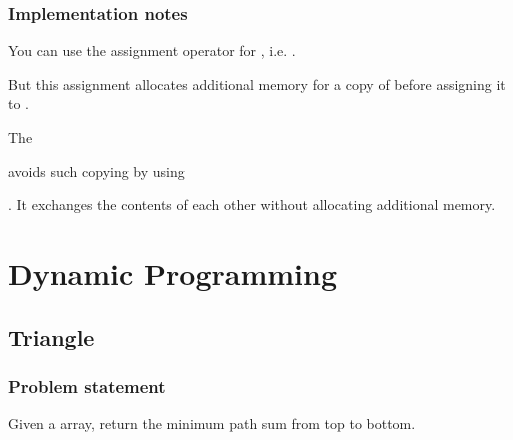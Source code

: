 \documentclass[letterpaper,12pt,english]{book}
\begin{document}
\subsection{Implementation notes}
\label{\detokenize{Recursive/17_Letter_Combinations_of_a_Phone_Number:implementation-notes}}
\sphinxAtStartPar
You can use the assignment operator \sphinxcode{\sphinxupquote{\textquotesingle{}=\textquotesingle{}}} for , i.e. .

\sphinxAtStartPar
But this assignment allocates additional memory for a copy of  before assigning it to .

\sphinxAtStartPar
The %
\begin{footnote}[93]\sphinxAtStartFootnote
{}
%
\end{footnote} avoids such copying by using %
\begin{footnote}[94]\sphinxAtStartFootnote
{}
%
\end{footnote}. It exchanges the contents of each other without allocating additional memory.

\sphinxstepscope


\chapter{Dynamic Programming}
\label{\detokenize{Dynamic_Programming/index:dynamic-programming}}\label{\detokenize{Dynamic_Programming/index::doc}}
\sphinxstepscope


\section{Triangle}
\label{\detokenize{Dynamic_Programming/05_DP_120_Triangle:triangle}}\label{\detokenize{Dynamic_Programming/05_DP_120_Triangle::doc}}

\subsection{Problem statement\sphinxfootnotemark[95]}
\label{\detokenize{Dynamic_Programming/05_DP_120_Triangle:problem-statement}}%
\begin{footnotetext}[95]\sphinxAtStartFootnote
{}
%
\end{footnotetext}\ignorespaces 
\sphinxAtStartPar
Given a  array, return the minimum path sum from top to bottom.
\end{document}
